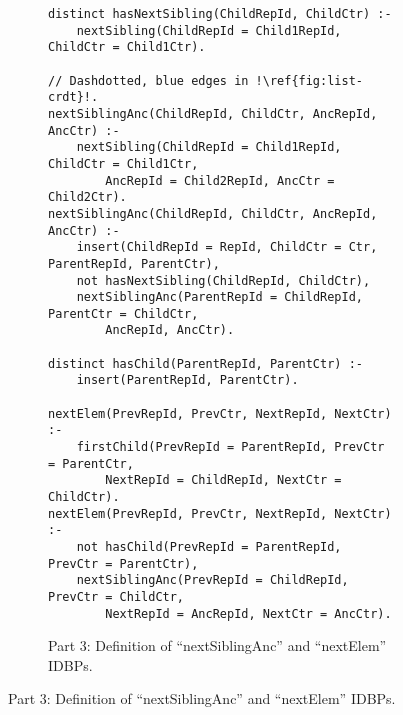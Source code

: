 \begin{figure}[htpb]\ContinuedFloat
    \centering

    \begin{subfigure}[b]{\textwidth}
        \begin{lstlisting}[keepspaces,escapechar=!]
distinct hasNextSibling(ChildRepId, ChildCtr) :-
    nextSibling(ChildRepId = Child1RepId, ChildCtr = Child1Ctr).

// Dashdotted, blue edges in !\ref{fig:list-crdt}!.
nextSiblingAnc(ChildRepId, ChildCtr, AncRepId, AncCtr) :-
    nextSibling(ChildRepId = Child1RepId, ChildCtr = Child1Ctr,
        AncRepId = Child2RepId, AncCtr = Child2Ctr).
nextSiblingAnc(ChildRepId, ChildCtr, AncRepId, AncCtr) :-
    insert(ChildRepId = RepId, ChildCtr = Ctr, ParentRepId, ParentCtr),
    not hasNextSibling(ChildRepId, ChildCtr),
    nextSiblingAnc(ParentRepId = ChildRepId, ParentCtr = ChildCtr,
        AncRepId, AncCtr).

distinct hasChild(ParentRepId, ParentCtr) :-
    insert(ParentRepId, ParentCtr).

nextElem(PrevRepId, PrevCtr, NextRepId, NextCtr) :-
    firstChild(PrevRepId = ParentRepId, PrevCtr = ParentCtr,
        NextRepId = ChildRepId, NextCtr = ChildCtr).
nextElem(PrevRepId, PrevCtr, NextRepId, NextCtr) :-
    not hasChild(PrevRepId = ParentRepId, PrevCtr = ParentCtr),
    nextSiblingAnc(PrevRepId = ChildRepId, PrevCtr = ChildCtr,
        NextRepId = AncRepId, NextCtr = AncCtr).\end{lstlisting}
        \caption{Part 3: Definition of ``nextSiblingAnc'' and ``nextElem'' \acp{IDBP}.}\label{code:list-crdt-datalog-dialect-part3}
    \end{subfigure}
\end{figure}

